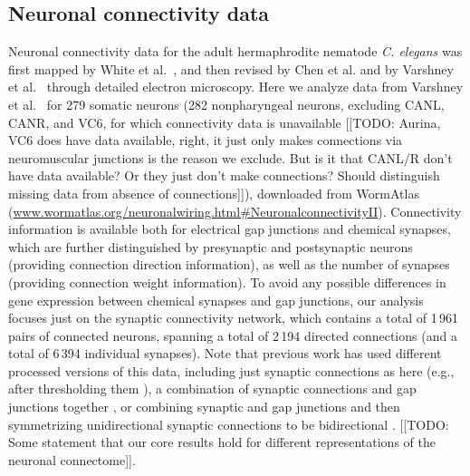 \documentclass[10pt,letterpaper]{article}
\begin{document}


\subsection*{Neuronal connectivity data}
Neuronal connectivity data for the adult hermaphrodite nematode \emph{C. elegans} was first mapped by White et al.~\cite{White:1986tx}, and then revised by Chen et al. \cite{Chen:2006ie} and by Varshney et al.~\cite{Varshney2011} through detailed electron microscopy.
Here we analyze data from Varshney et al.~\cite{Varshney2011} for 279 somatic neurons (282 nonpharyngeal neurons, excluding CANL, CANR, and VC6, for which connectivity data is unavailable [[TODO: Aurina, VC6 does have data available, right, it just only makes connections via neuromuscular junctions is the reason we exclude. But is it that CANL/R don't have data available? Or they just don't make connections? Should distinguish missing data from absence of connections]]), downloaded from WormAtlas (\url{www.wormatlas.org/neuronalwiring.html#NeuronalconnectivityII}).
Connectivity information is available both for electrical gap junctions and chemical synapses, which are further distinguished by presynaptic and postsynaptic neurons (providing connection direction information), as well as the number of synapses (providing connection weight information).
To avoid any possible differences in gene expression between chemical synapses and gap junctions, our analysis focuses just on the synaptic connectivity network, which contains a total of 1\,961 pairs of connected neurons, spanning a total of 2\,194 directed connections (and a total of 6\,394 individual synapses).
Note that previous work has used different processed versions of this data, including just synaptic connections as here (e.g., after thresholding them \cite{Kashtan:2004ev}), a combination of synaptic connections and gap junctions together \cite{Azulay:2016cg, Kim:2016gl}, or combining synaptic and gap junctions and then symmetrizing unidirectional synaptic connections to be bidirectional \cite{Towlson:2013gf, Kim:2014bu, Pavlovic:2014gx}.
[[TODO: Some statement that our core results hold for different representations of the neuronal connectome]].
\end{document}
